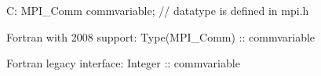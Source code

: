 C:
MPI_Comm commvariable; // datatype is defined in mpi.h

Fortran with 2008 support:
Type(MPI_Comm) :: commvariable

Fortran legacy interface:
Integer :: commvariable

